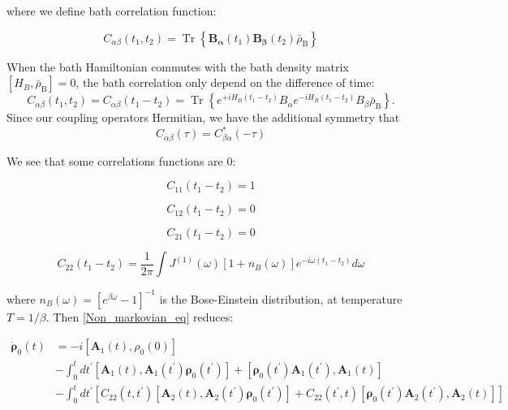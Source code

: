 \documentclass[%
preprint,
onecolumn,
notitlepag,
 amsmath,amssymb,
 aps,
 pra,
]{revtex4-2}
\begin{document}
\begin{itemize}
where we  define bath correlation function: 

\begin{equation}
C_{\alpha \beta}\left(t_{1}, t_{2}\right)=\operatorname{Tr}\left\{\boldsymbol{B}_{\boldsymbol{\alpha}}\left(t_{1}\right) \boldsymbol{B}_{\boldsymbol{\beta}}\left(t_{2}\right) \bar{\rho}_{\mathrm{B}}\right\}
\end{equation}

 When the bath Hamiltonian commutes with the bath density matrix $\left[H_{B}, \bar{\rho}_{\mathrm{B}}\right]=0$, the bath correlation only depend on the difference of time:
$$
C_{\alpha \beta}\left(t_{1}, t_{2}\right)=C_{\alpha \beta}\left(t_{1}-t_{2}\right)=\operatorname{Tr}\left\{e^{+i H_{B}\left(t_{1}-t_{2}\right)} B_{\alpha} e^{-i H_{B}\left(t_{1}-t_{2}\right)} B_{\beta} \bar{\rho}_{\mathrm{B}}\right\} .
$$
Since our coupling operators Hermitian, we have the additional symmetry that
$$
C_{\alpha \beta}(\tau)=C_{\beta \alpha}^{*}(-\tau)
$$

We see that some correlations functions are 0: 

\begin{equation}
    C_{11}(t_1-t_2)=1
\end{equation}

\begin{equation}
    C_{12}(t_1-t_2)=0
\end{equation}

\begin{equation}
    C_{21}(t_1-t_2)=0
\end{equation}

\begin{equation}
    C_{22}(t_1-t_2)=\frac{1}{2 \pi} \int J^{(1)}(\omega) \left[1+ n_B(\omega) \right] e ^{- i \omega (t_1- t_2)} d\omega
\end{equation}

where $n_B(\omega) = \left[e^{\beta \omega}-1\right]^{-1} $ is the Bose-Einstein distribution, at temperature $T= 1/\beta$. Then \eqref{Non_markovian_eq} reduces:

\begin{equation}
\begin{aligned}
\dot{\boldsymbol{\rho}}_0(t) &=  -i \left[ \boldsymbol{A}_1(t) , \rho_0(0) \right] \\
&- \int_{0}^{t} d t^{\prime}\left[\boldsymbol{A}_1(t), \boldsymbol{A}_1\left(t^{\prime}\right) \boldsymbol{\rho}_0\left(t^{\prime}\right)\right] + \left[\boldsymbol{\rho}_0\left(t^{\prime}\right) \boldsymbol{A}_1 \left(t^{\prime}\right), \boldsymbol{A}_1(t)\right]  \\
& - \int_{0}^{t} d t^{\prime}\left[C_{22}\left(t, t^{\prime}\right)\left[\boldsymbol{A}_2(t), \boldsymbol{A}_2\left(t^{\prime}\right) \boldsymbol{\rho}_0 \left(t^{\prime}\right)\right] +C_{22}\left(t^{\prime}, t\right)\left[\boldsymbol{\rho}_0 \left(t^{\prime}\right) \boldsymbol{A}_2 \left(t^{\prime}\right), \boldsymbol{A}_2 (t)\right]\right] 
\end{aligned}
\label{Non_markovian_eq}
\end{equation}


\end{itemize}
\end{document}
